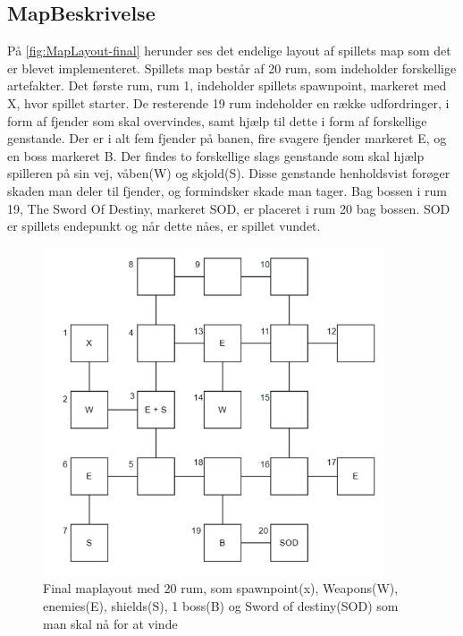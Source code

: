 \subsection{MapBeskrivelse}

På \autoref{fig:MapLayout-final} herunder ses det endelige layout af spillets map som det er blevet implementeret. 
Spillets map består af 20 rum, som indeholder forskellige artefakter.  
Det første rum, rum 1, indeholder spillets spawnpoint, markeret med X, hvor spillet starter.  
De resterende 19 rum indeholder en række udfordringer, i form af fjender som skal overvindes, samt hjælp til dette i form af forskellige genstande. 
Der er i alt fem fjender på banen, fire svagere fjender markeret E, og en boss markeret B. 
Der findes to forskellige slags genstande som skal hjælp spilleren på sin vej, våben(W) og skjold(S).  
Disse genstande henholdsvist forøger skaden man deler til fjender, og formindsker skade man tager. 
Bag bossen i rum 19, 
The Sword Of Destiny, markeret SOD, er placeret i rum 20 bag bossen. SOD er spillets endepunkt og når dette nåes, er spillet vundet.



\begin{figure}[H]
\centering
\includegraphics[width = 0.9\textwidth]{02-Body/Images/MapLayout.PNG}
\caption{Final maplayout med 20 rum, som spawnpoint(x), Weapons(W), enemies(E), shields(S), 1 boss(B) og Sword of destiny(SOD) som man skal nå for at vinde}
\label{fig:MapLayout-final}
\end{figure}